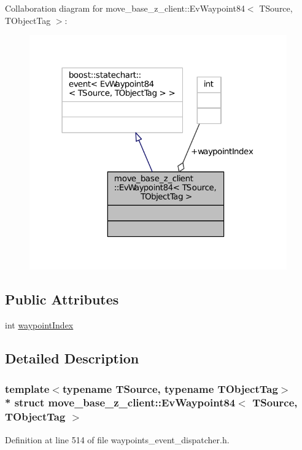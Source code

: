 Collaboration diagram for move\+\_\+base\+\_\+z\+\_\+client\+:\+:Ev\+Waypoint84$<$ T\+Source, T\+Object\+Tag $>$\+:
\nopagebreak
\begin{figure}[H]
\begin{center}
\leavevmode
\includegraphics[width=314pt]{structmove__base__z__client_1_1EvWaypoint84__coll__graph}
\end{center}
\end{figure}
\subsection*{Public Attributes}
\begin{DoxyCompactItemize}
\item 
int \hyperlink{structmove__base__z__client_1_1EvWaypoint84_a530e799efb6e13dccf89eca731db0667}{waypoint\+Index}
\end{DoxyCompactItemize}


\subsection{Detailed Description}
\subsubsection*{template$<$typename T\+Source, typename T\+Object\+Tag$>$\\*
struct move\+\_\+base\+\_\+z\+\_\+client\+::\+Ev\+Waypoint84$<$ T\+Source, T\+Object\+Tag $>$}



Definition at line 514 of file waypoints\+\_\+event\+\_\+dispatcher.\+h.



